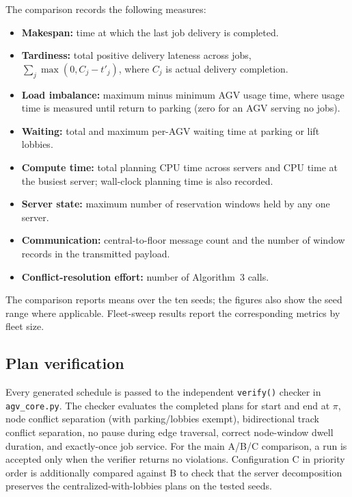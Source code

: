 \documentclass[11pt]{article}
\begin{document}
The comparison records the following measures:
\begin{itemize}
  \item \textbf{Makespan:} time at which the last job delivery is completed.
  \item \textbf{Tardiness:} total positive delivery lateness across jobs,
        $\sum_j\max(0,C_j-t'_j)$, where $C_j$ is actual delivery completion.
  \item \textbf{Load imbalance:} maximum minus minimum AGV usage time, where
        usage time is measured until return to parking (zero for an AGV serving
        no jobs).
  \item \textbf{Waiting:} total and maximum per-AGV waiting time at parking
        or lift lobbies.
  \item \textbf{Compute time:} total planning CPU time across servers and CPU
        time at the busiest server; wall-clock planning time is also recorded.
  \item \textbf{Server state:} maximum number of reservation windows held by
        any one server.
  \item \textbf{Communication:} central-to-floor message count and the number
        of window records in the transmitted payload.
  \item \textbf{Conflict-resolution effort:} number of Algorithm~3 calls.
\end{itemize}

The comparison reports means over the ten seeds; the figures also show the
seed range where applicable. Fleet-sweep results report the corresponding
metrics by fleet size.

\subsection{Plan verification}

Every generated schedule is passed to the independent \texttt{verify()}
checker in \texttt{agv\_core.py}. The checker evaluates the completed plans
for start and end at $\pi$, node conflict separation (with parking/lobbies
exempt), bidirectional track conflict separation, no pause during edge
traversal, correct node-window dwell duration, and exactly-once job service.
For the main A/B/C comparison, a run is accepted only when the verifier
returns no violations. Configuration C in priority order is additionally
compared against B to check that the server decomposition preserves the
centralized-with-lobbies plans on the tested seeds.
\end{document}
